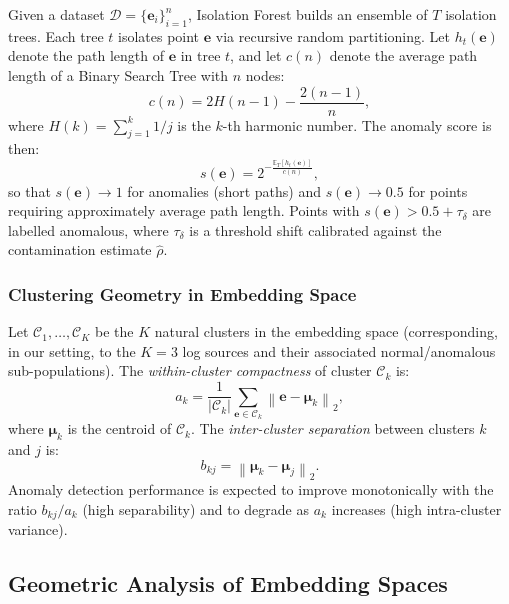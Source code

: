 \documentclass[conference]{IEEEtran}
\begin{document}
Given a dataset $\mathcal{D} = \{\mathbf{e}_i\}_{i=1}^{n}$, Isolation Forest
builds an ensemble of $T$ isolation trees.  Each tree $t$ isolates point
$\mathbf{e}$ via recursive random partitioning.  Let $h_t(\mathbf{e})$ denote
the path length of $\mathbf{e}$ in tree $t$, and let $c(n)$ denote the
average path length of a Binary Search Tree with $n$ nodes:
\begin{equation}
c(n) = 2H(n-1) - \frac{2(n-1)}{n},
\label{eq:bst_path}
\end{equation}
where $H(k) = \sum_{j=1}^{k} 1/j$ is the $k$-th harmonic number.  The
anomaly score is then:
\begin{equation}
s(\mathbf{e}) = 2^{-\frac{\mathbb{E}_T[h_t(\mathbf{e})]}{c(n)}},
\label{eq:iforest_score}
\end{equation}
so that $s(\mathbf{e}) \to 1$ for anomalies (short paths) and
$s(\mathbf{e}) \to 0.5$ for points requiring approximately average path
length.  Points with $s(\mathbf{e}) > 0.5 + \tau_\delta$ are labelled
anomalous, where $\tau_\delta$ is a threshold shift calibrated against
the contamination estimate $\hat{\rho}$.

\subsubsection{Clustering Geometry in Embedding Space}

Let $\mathcal{C}_1, \ldots, \mathcal{C}_K$ be the $K$ natural clusters in
the embedding space (corresponding, in our setting, to the $K = 3$ log
sources and their associated normal/anomalous sub-populations).  The
\emph{within-cluster compactness} of cluster $\mathcal{C}_k$ is:
\begin{equation}
a_k = \frac{1}{|\mathcal{C}_k|} \sum_{\mathbf{e} \in \mathcal{C}_k}
\left\| \mathbf{e} - \boldsymbol{\mu}_k \right\|_2,
\label{eq:intra_cluster}
\end{equation}
where $\boldsymbol{\mu}_k$ is the centroid of $\mathcal{C}_k$.  The
\emph{inter-cluster separation} between clusters $k$ and $j$ is:
\begin{equation}
b_{kj} = \left\| \boldsymbol{\mu}_k - \boldsymbol{\mu}_j \right\|_2.
\label{eq:inter_cluster}
\end{equation}
Anomaly detection performance is expected to improve monotonically with the
ratio $b_{kj} / a_k$ (high separability) and to degrade as $a_k$ increases
(high intra-cluster variance).

\subsection{Geometric Analysis of Embedding Spaces}
\label{sec:embedding_geometry}
\end{document}
